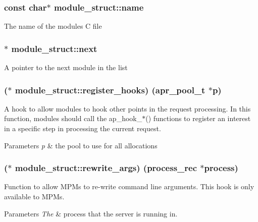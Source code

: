 \subsubsection[{\texorpdfstring{name}{name}}]{\setlength{\rightskip}{0pt plus 5cm}const char$\ast$ module\+\_\+struct\+::name}\hypertarget{structmodule__struct_a88f43c2576387678ac534313fd0e7ece}{}\label{structmodule__struct_a88f43c2576387678ac534313fd0e7ece}
The name of the module\textquotesingle{}s C file 
\subsubsection[{\texorpdfstring{next}{next}}]{ $\ast$ module\+\_\+struct\+::next}\hypertarget{structmodule__struct_aacf77ae0ad30879346ae153037ed41ea}{}\label{structmodule__struct_aacf77ae0ad30879346ae153037ed41ea}
A pointer to the next module in the list 
\subsubsection[{\texorpdfstring{register\+\_\+hooks}{register_hooks}}]{($\ast$ module\+\_\+struct\+::register\+\_\+hooks) ({\bf apr\+\_\+pool\+\_\+t} $\ast${\bf p})}\hypertarget{structmodule__struct_a628b4e635e922228275919f1b595c105}{}\label{structmodule__struct_a628b4e635e922228275919f1b595c105}
A hook to allow modules to hook other points in the request processing. In this function, modules should call the ap\+\_\+hook\+\_\+$\ast$() functions to register an interest in a specific step in processing the current request. 
\begin{DoxyParams}{Parameters}
{\em p} & the pool to use for all allocations \\
\hline
\end{DoxyParams}
\subsubsection[{\texorpdfstring{rewrite\+\_\+args}{rewrite_args}}]{($\ast$ module\+\_\+struct\+::rewrite\+\_\+args) ({\bf process\+\_\+rec} $\ast${\bf process})}\hypertarget{structmodule__struct_a413175b9e3a97400995e7f03d6954dee}{}\label{structmodule__struct_a413175b9e3a97400995e7f03d6954dee}
Function to allow M\+P\+Ms to re-\/write command line arguments. This hook is only available to M\+P\+Ms. 
\begin{DoxyParams}{Parameters}
{\em The} & process that the server is running in. \\
\hline
\end{DoxyParams}
